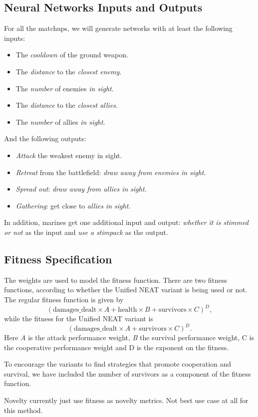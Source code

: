 \subsection{Neural Networks Inputs and Outputs}

For all the matchups, we will generate networks with at least the
following inputs:
\begin{itemize}
    \item The \emph{cooldown} of the ground weapon.
    \item The \emph{distance} to the \emph{closest enemy}.
    \item The \emph{number} of enemies \emph{in sight}.
    \item The \emph{distance} to the \emph{closest allies}.
    \item The \emph{number} of allies \emph{in sight}.
\end{itemize}

And the following outputs:
\begin{itemize}
    \item \emph{Attack} the weakest enemy in sight.
    \item \emph{Retreat} from the battlefield: \emph{draw away from enemies in sight}.
    \item \emph{Spread out}: \emph{draw away from allies in sight}.
    \item \emph{Gathering}: get close to \emph{allies in sight}.
\end{itemize}

In addition, marines get one additional input and output:
\emph{whether it is stimmed or not} as the input and \emph{use a
  stimpack} as the output.

\subsection{Fitness Specification}

The weights are used to model the fitness function. There are two
fitness functions, according to whether the Unified NEAT variant is
being used or not.  The regular fitness function is given by
\begin{equation*}
  (\text{damages\_dealt} \times A + \text{health} \times B + \text{survivors} \times C)^D,
\end{equation*}
while the fitness for the Unified NEAT variant is
\begin{equation*}
  (\text{damages\_dealt} \times A + \text{survivors} \times C)^D.
\end{equation*}
Here \emph{A} is the attack performance weight, \emph{B} the survival
performance weight, C is the cooperative performance weight and D is
the exponent on the fitness.

To encourage the variants to find strategies that promote cooperation
and survival, we have included the number of survivors as a component
of the fitness function.

Novelty currently just use fitness as novelty metrics. Not best use
case at all for this method.

